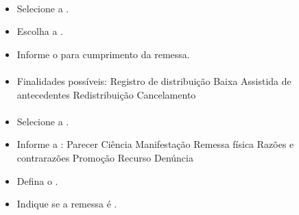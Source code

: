 \documentclass[letterpaper,10pt,brazil]{sphinxmanual}
\begin{document}
\paragraph{}
\label{\detokenize{projud_36_realizarremessa:delegacia}}\begin{itemize}
\item {} 
\sphinxAtStartPar
Selecione a .

\item {} 
\sphinxAtStartPar
Escolha a .

\item {} 
\sphinxAtStartPar
Informe o  para cumprimento da remessa.

\end{itemize}


\paragraph{}
\label{\detokenize{projud_36_realizarremessa:distribuidor}}\begin{itemize}
\item {} 
\sphinxAtStartPar
Finalidades possíveis:
\sphinxhyphen{} Registro de distribuição
\sphinxhyphen{} Baixa
\sphinxhyphen{} Assistida de antecedentes
\sphinxhyphen{} Redistribuição
\sphinxhyphen{} Cancelamento

\end{itemize}


\paragraph{}
\label{\detokenize{projud_36_realizarremessa:ministerio-publico}}\begin{itemize}
\item {} 
\sphinxAtStartPar
Selecione a .

\item {} 
\sphinxAtStartPar
Informe a :
\sphinxhyphen{} Parecer
\sphinxhyphen{} Ciência
\sphinxhyphen{} Manifestação
\sphinxhyphen{} Remessa física
\sphinxhyphen{} Razões e contra\sphinxhyphen{}razões
\sphinxhyphen{} Promoção
\sphinxhyphen{} Recurso
\sphinxhyphen{} Denúncia

\item {} 
\sphinxAtStartPar
Defina o .

\item {} 
\sphinxAtStartPar
Indique se a remessa é .

\end{itemize}
\end{document}
